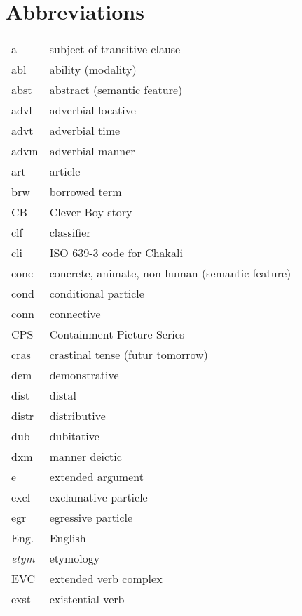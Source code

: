 
\chapter*{Abbreviations}
\label{sec-ABB}



 \begin{xtabular}{ll}


{\sc a} & subject of transitive clause\\
{\sc abl} & ability (modality)\\
 {\sc abst} & abstract (semantic feature)\\
 {\sc advl} & adverbial locative \\
 {\sc advt} & adverbial time \\
{\sc advm}&  adverbial manner\\
{\sc art} &  article\\

brw &  borrowed term\\%

CB  & Clever Boy story\\
{\sc clf} & classifier\\
cli & ISO 639-3 code for Chakali\\
 {\sc conc} & concrete, animate, non-human (semantic feature)\\
 {\sc cond} & conditional particle\\
 {\sc conn} &  connective\\
CPS & Containment Picture Series\\
 {\sc cras} & crastinal tense (futur tomorrow) \\

 {\sc dem} & demonstrative \\
 {\sc dist} & distal \\%
 {\sc distr} & distributive \\
 {\sc dub} & dubitative \\%
{\sc dxm} & manner deictic\\
{\sc e} & extended argument\\
{\sc excl} & exclamative particle\\
{\sc egr} & egressive particle\\
Eng. & English\\
{\it etym} & etymology\\
EVC & extended verb complex\\
{\sc exst} & existential verb\\



\end{xtabular}
